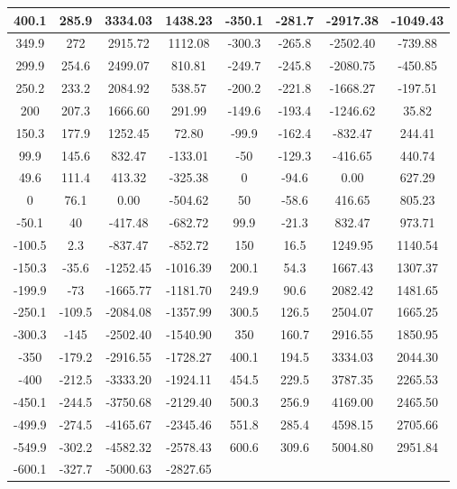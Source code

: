 \documentclass[11pt]{article}
\begin{document}
\begin{enumerate}
\begin{table}[H]
\begin{tabular}{|c|c|c|c|c|c|c|c|}
            400.1  & 285.9  & 3334.03  & 1438.23  & -350.1 & -281.7 & -2917.38  & -1049.43  \\\hline
            349.9  & 272    & 2915.72  & 1112.08  & -300.3 & -265.8 & -2502.40  & -739.88  \\\hline
            299.9  & 254.6  & 2499.07  & 810.81  & -249.7 & -245.8 & -2080.75  & -450.85  \\\hline
            250.2  & 233.2  & 2084.92  & 538.57  & -200.2 & -221.8 & -1668.27  & -197.51  \\\hline
            200    & 207.3  & 1666.60  & 291.99  & -149.6 & -193.4 & -1246.62  & 35.82  \\\hline
            150.3  & 177.9  & 1252.45  & 72.80  & -99.9  & -162.4 & -832.47  & 244.41  \\\hline
            99.9   & 145.6  & 832.47  & -133.01  & -50    & -129.3 & -416.65  & 440.74  \\\hline
            49.6   & 111.4  & 413.32  & -325.38  & 0      & -94.6  & 0.00   & 627.29  \\\hline
            0      & 76.1   & 0.00   & -504.62  & 50     & -58.6  & 416.65  & 805.23  \\\hline
            -50.1  & 40     & -417.48  & -682.72  & 99.9   & -21.3  & 832.47  & 973.71  \\\hline
            -100.5 & 2.3    & -837.47  & -852.72  & 150    & 16.5   & 1249.95  & 1140.54  \\\hline
            -150.3 & -35.6  & -1252.45  & -1016.39  & 200.1  & 54.3   & 1667.43  & 1307.37  \\\hline
            -199.9 & -73    & -1665.77  & -1181.70  & 249.9  & 90.6   & 2082.42  & 1481.65  \\\hline
            -250.1 & -109.5 & -2084.08  & -1357.99  & 300.5  & 126.5  & 2504.07  & 1665.25  \\\hline
            -300.3 & -145   & -2502.40  & -1540.90  & 350    & 160.7  & 2916.55  & 1850.95  \\\hline
            -350   & -179.2 & -2916.55  & -1728.27  & 400.1  & 194.5  & 3334.03  & 2044.30  \\\hline
            -400   & -212.5 & -3333.20  & -1924.11  & 454.5  & 229.5  & 3787.35  & 2265.53  \\\hline
            -450.1 & -244.5 & -3750.68  & -2129.40  & 500.3  & 256.9  & 4169.00  & 2465.50  \\\hline
            -499.9 & -274.5 & -4165.67  & -2345.46  & 551.8  & 285.4  & 4598.15  & 2705.66  \\\hline
            -549.9 & -302.2 & -4582.32  & -2578.43  & 600.6  & 309.6  & 5004.80  & 2951.84  \\\hline
            -600.1 & -327.7 & -5000.63  & -2827.65  &        &        &        &  \\\hline
            \end{tabular}%
          \label{tab:addlabel}%
        \end{table}%

\end{enumerate}
\end{document}
